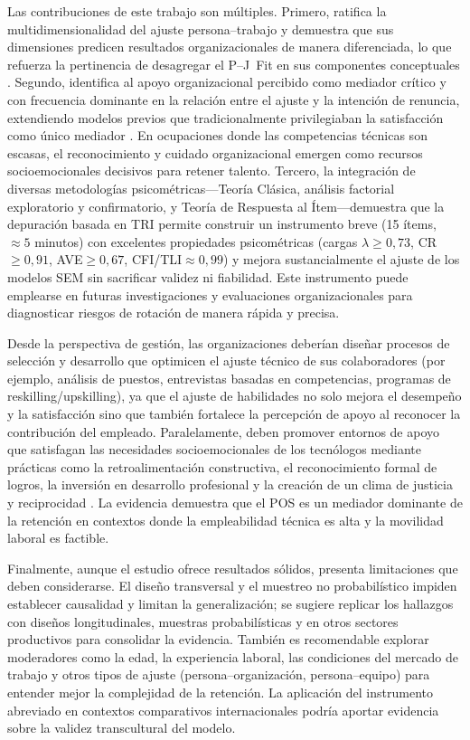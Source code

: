 Las contribuciones de este trabajo son múltiples. Primero, ratifica la multidimensionalidad del ajuste persona–trabajo y demuestra que sus dimensiones predicen resultados organizacionales de manera diferenciada, lo que refuerza la pertinencia de desagregar el P–J Fit en sus componentes conceptuales \cite{lauver_distinguishing_2001,Cable2002}. Segundo, identifica al apoyo organizacional percibido como mediador crítico y con frecuencia dominante en la relación entre el ajuste y la intención de renuncia, extendiendo modelos previos que tradicionalmente privilegiaban la satisfacción como único mediador \cite{tett_job_1993,griffeth_meta_2000}. En ocupaciones donde las competencias técnicas son escasas, el reconocimiento y cuidado organizacional emergen como recursos socioemocionales decisivos para retener talento. Tercero, la integración de diversas metodologías psicométricas—Teoría Clásica, análisis factorial exploratorio y confirmatorio, y Teoría de Respuesta al Ítem—demuestra que la depuración basada en TRI permite construir un instrumento breve (15 ítems, $\approx 5$ minutos) con excelentes propiedades psicométricas (cargas $\lambda\geq0{,}73$, CR$\geq0{,}91$, AVE$\geq0{,}67$, CFI/TLI$\approx0,99$) y mejora sustancialmente el ajuste de los modelos SEM sin sacrificar validez ni fiabilidad. Este instrumento puede emplearse en futuras investigaciones y evaluaciones organizacionales para diagnosticar riesgos de rotación de manera rápida y precisa.

Desde la perspectiva de gestión, las organizaciones deberían diseñar procesos de selección y desarrollo que optimicen el ajuste técnico de sus colaboradores (por ejemplo, análisis de puestos, entrevistas basadas en competencias, programas de reskilling/upskilling), ya que el ajuste de habilidades no solo mejora el desempeño y la satisfacción sino que también fortalece la percepción de apoyo al reconocer la contribución del empleado. Paralelamente, deben promover entornos de apoyo que satisfagan las necesidades socioemocionales de los tecnólogos mediante prácticas como la retroalimentación constructiva, el reconocimiento formal de logros, la inversión en desarrollo profesional y la creación de un clima de justicia y reciprocidad \cite{rhoades_perceived_2002}. La evidencia demuestra que el POS es un mediador dominante de la retención en contextos donde la empleabilidad técnica es alta y la movilidad laboral es factible.

Finalmente, aunque el estudio ofrece resultados sólidos, presenta limitaciones que deben considerarse. El diseño transversal y el muestreo no probabilístico impiden establecer causalidad y limitan la generalización; se sugiere replicar los hallazgos con diseños longitudinales, muestras probabilísticas y en otros sectores productivos para consolidar la evidencia. También es recomendable explorar moderadores como la edad, la experiencia laboral, las condiciones del mercado de trabajo y otros tipos de ajuste (persona–organización, persona–equipo) para entender mejor la complejidad de la retención. La aplicación del instrumento abreviado en contextos comparativos internacionales podría aportar evidencia sobre la validez transcultural del modelo.

